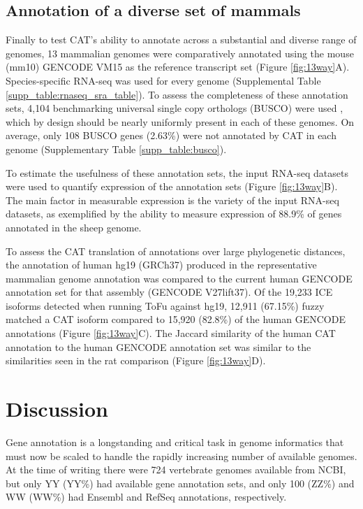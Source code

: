 \documentclass[fleqn,10pt]{wlscirep}
\begin{document}
\subsection*{Annotation of a diverse set of mammals}

Finally to test CAT's ability to annotate across a substantial and diverse range of genomes, 13 mammalian genomes were comparatively annotated using the mouse (mm10) GENCODE VM15 as the reference transcript set (Figure \ref{fig:13way}A). Species-specific RNA-seq was used for every genome (Supplemental Table \ref{supp_table:rnaseq_sra_table}). To assess the completeness of these annotation sets, 4,104 benchmarking universal single copy orthologs (BUSCO) were used \cite{simao2015busco}, which by design should be nearly uniformly present in each of these genomes.  On average, only 108 BUSCO genes (2.63\%) were not annotated by CAT in each genome (Supplementary Table \ref{supp_table:busco}). 

To estimate the usefulness of these annotation sets, the input RNA-seq datasets were used to quantify expression of the annotation sets (Figure \ref{fig:13way}B). The main factor in measurable expression is the variety of the input RNA-seq datasets, as exemplified by the ability to measure expression of 88.9\% of genes annotated in the sheep genome. 

To assess the CAT translation of annotations over large phylogenetic distances, the annotation of human hg19 (GRCh37) produced in the representative mammalian genome annotation was compared to the current human GENCODE annotation set for that assembly (GENCODE V27lift37). Of the 19,233 ICE isoforms detected when running ToFu \cite{gordon2015widespread} against hg19, 12,911 (67.15\%) fuzzy matched a CAT isoform compared to 15,920 (82.8\%) of the human GENCODE annotations (Figure \ref{fig:13way}C). The Jaccard similarity of the human CAT annotation to the human GENCODE annotation set was similar to the similarities seen in the rat comparison (Figure \ref{fig:13way}D).

\section*{Discussion}

Gene annotation is a longstanding and critical task in genome informatics that must now be scaled to handle the rapidly increasing number of available genomes. At the time of writing there were 724 vertebrate genomes available from NCBI, but only YY (YY\%) had available gene annotation sets, and only 100 (ZZ\%) and WW (WW\%) had Ensembl and RefSeq annotations, respectively.
\end{document}
